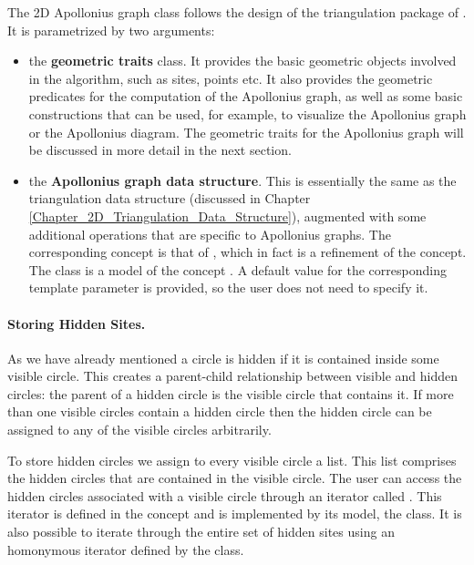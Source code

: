 The 2D Apollonius graph class
follows the design of the triangulation package of \cgal. It is
parametrized by two arguments:
\begin{itemize}
\item the {\bf geometric traits} class. It provides the basic
  geometric objects involved in the algorithm, such as sites, points
  etc. It also provides the geometric predicates for the computation
  of the Apollonius graph, as well as some basic constructions that
  can be used, for example, to visualize the Apollonius graph or the
  Apollonius diagram. The geometric traits for the Apollonius graph
  will be discussed in more detail in the next section.
\item the {\bf Apollonius graph data structure}. This is essentially
  the same as the triangulation data structure (discussed in Chapter
  \ref{Chapter_2D_Triangulation_Data_Structure}), augmented with some
  additional operations that are specific to Apollonius graphs. The
  corresponding concept is that of
  , which in fact is a refinement
  of the  concept. The class
   is a model of
  the concept . A default value
  for the corresponding template parameter is provided, so the user
  does not need to specify it.
\end{itemize}

\paragraph{Storing Hidden Sites.}
As we have already mentioned a circle is hidden if it is contained
inside some visible circle. This creates a parent-child relationship
between visible and hidden circles: the parent of a hidden circle is the
visible circle that contains it. If more than one visible circles
contain a hidden circle then the hidden circle can be assigned to any of
the visible circles arbitrarily.

To store hidden circles we assign to every visible circle a list. This
list comprises the hidden circles that are contained in the
visible circle. The user can access the hidden circles associated with
a visible circle through an iterator called
. This iterator is defined in the
 concept and is implemented by its
model, the 
class. It is also possible to iterate through the entire set of hidden
sites using an homonymous iterator defined by the
 class. 

